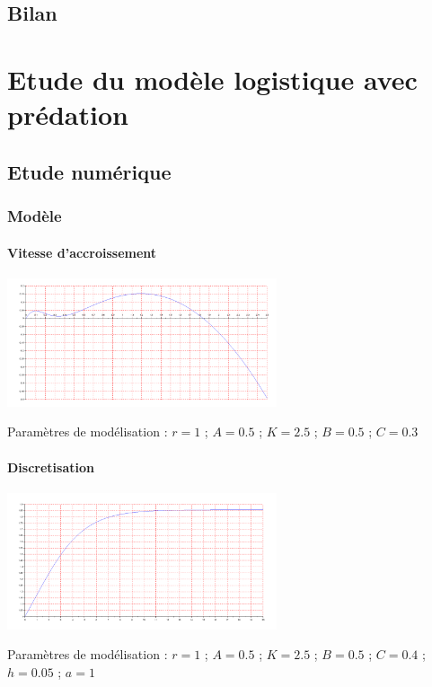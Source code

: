 \documentclass{article}
\begin{document}
\subsection{Bilan}
\paragraph{}

\newpage
\section{Etude du modèle logistique avec prédation}

\subsection{Etude numérique}

\subsubsection{Modèle}

\paragraph{Vitesse d'accroissement}
\begin{center}
\includegraphics[width=300px]{img/part2/Log.png}
\end{center}
Paramètres de modélisation : $r=1$ ; $A=0.5$ ; $K=2.5$ ; $B=0.5$ ; $C=0.3$
\paragraph{}


\paragraph{Discretisation}
\begin{center}
\includegraphics[width=300px]{img/part2/Traj.png}
\end{center}
Paramètres de modélisation : $r=1$ ; $A=0.5$ ; $K=2.5$ ; $B=0.5$ ; $C=0.4$ ; $h=0.05$ ; $a=1$
\end{document}
